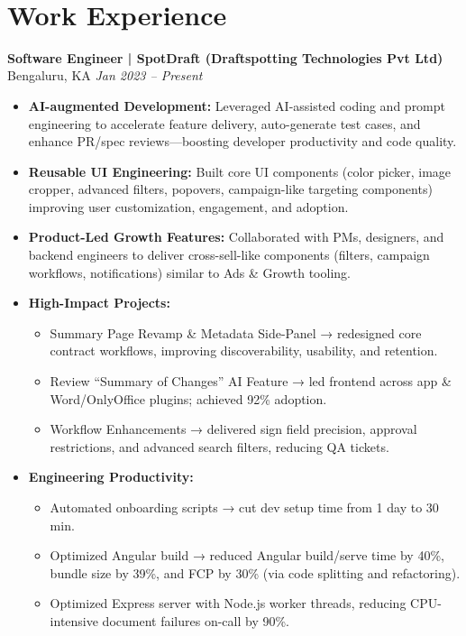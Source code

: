 \documentclass[a4paper,10pt]{article}
\begin{document}
\begin{center}
    {\Huge \textbf{\ContactName}}\\[6pt]
    \ContactLine{\quad|\quad}
\end{center}

\vspace{0.5em}

\section{Work Experience}

\textbf{Software Engineer | SpotDraft (Draftspotting Technologies Pvt Ltd)} \hfill Bengaluru, KA \quad \textit{Jan 2023 – Present}

\begin{itemize}
  \item \textbf{AI-augmented Development:} Leveraged AI-assisted coding and prompt engineering to accelerate feature delivery, auto-generate test cases, and enhance PR/spec reviews—boosting developer productivity and code quality.
  \item \textbf{Reusable UI Engineering:} Built core UI components (color picker, image cropper, advanced filters, popovers, campaign-like targeting components) improving user customization, engagement, and adoption.
  \item \textbf{Product-Led Growth Features:} Collaborated with PMs, designers, and backend engineers to deliver cross-sell-like components (filters, campaign workflows, notifications) similar to Ads \& Growth tooling.
  \item \textbf{High-Impact Projects:}
    \begin{itemize}
      \item Summary Page Revamp \& Metadata Side-Panel → redesigned core contract workflows, improving discoverability, usability, and retention.
      \item Review “Summary of Changes” AI Feature → led frontend across app \& Word/OnlyOffice plugins; achieved 92\% adoption.
      \item Workflow Enhancements → delivered sign field precision, approval restrictions, and advanced search filters, reducing QA tickets.
    \end{itemize}
  \item \textbf{Engineering Productivity:}
    \begin{itemize}
      \item Automated onboarding scripts → cut dev setup time from 1 day to 30 min.
      \item Optimized Angular build → reduced Angular build/serve time by 40\%, bundle size by 39\%, and FCP by 30\% (via code splitting and refactoring).
      \item Optimized Express server with Node.js worker threads, reducing CPU-intensive document failures on-call by 90\%.
    \end{itemize}
\end{itemize}
\end{document}
